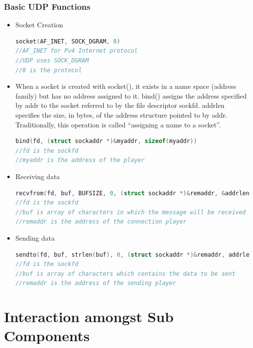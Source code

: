 \documentclass{article}
\begin{document}
				\subsubsection{Basic UDP Functions}
					\begin{itemize}
						\item Socket Creation
							\begin{lstlisting}[language=C++, caption={socket()}]
socket(AF_INET, SOCK_DGRAM, 0)		
//AF_INET for Pv4 Internet protocol
//UDP uses SOCK_DGRAM 
//0 is the protocol
							\end{lstlisting}
						\item When a socket is created with socket(), it exists in a name space (address family) but has no address assigned to it. bind() assigns the address specified by addr to the socket referred to by the file descriptor sockfd. addrlen specifies the size, in bytes, of the address structure pointed to by addr. Traditionally, this operation is called ``assigning a name to a socket''.
							\begin{lstlisting}[language=C++, caption={bind()}]
bind(fd, (struct sockaddr *)&myaddr, sizeof(myaddr))
//fd is the sockfd
//myaddr is the address of the player

							\end{lstlisting}
						\item Receiving data
							\begin{lstlisting}[language=C++, caption={recvfrom()}]
recvfrom(fd, buf, BUFSIZE, 0, (struct sockaddr *)&remaddr, &addrlen)
//fd is the sockfd
//buf is array of characters in which the message will be received
//remaddr is the address of the connection player
							\end{lstlisting}
						\item Sending data
							\begin{lstlisting}[language=C++, caption={sendto()}]
sendto(fd, buf, strlen(buf), 0, (struct sockaddr *)&remaddr, addrlen)
//fd is the sockfd
//buf is array of characters which contains the data to be sent
//remaddr is the address of the sending player
							\end{lstlisting}
					\end{itemize}
	\section{Interaction amongst Sub Components}
\end{document}
